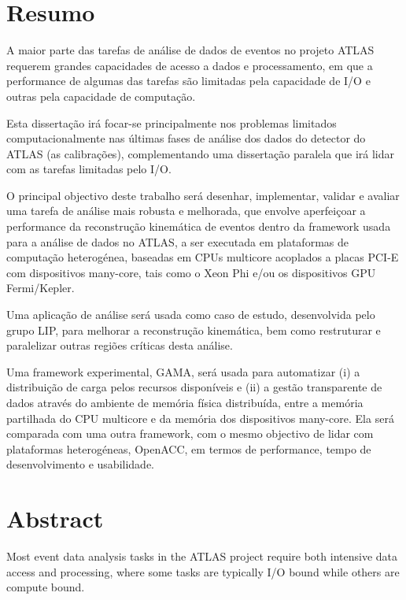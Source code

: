 
\chapter*{Resumo}

A maior parte das tarefas de análise de dados de eventos no projeto ATLAS requerem grandes capacidades de acesso a dados e processamento, em que a performance de algumas das tarefas são limitadas pela capacidade de I/O e outras pela capacidade de computação.

Esta dissertação irá focar-se principalmente nos problemas limitados computacionalmente nas últimas fases de análise dos dados do detector do ATLAS (as calibrações), complementando uma dissertação paralela que irá lidar com as tarefas limitadas pelo I/O.

O principal objectivo deste trabalho será desenhar, implementar, validar e avaliar uma tarefa de análise mais robusta e melhorada, que envolve aperfeiçoar a performance da reconstrução kinemática de eventos dentro da framework usada para a análise de dados no ATLAS, a ser executada em plataformas de computação heterogénea, baseadas em CPUs multicore acoplados a placas PCI-E com dispositivos many-core, tais como o \intel Xeon Phi e/ou os dispositivos GPU \nvidia Fermi/Kepler.

Uma aplicação de análise será usada como caso de estudo, desenvolvida pelo grupo LIP, para melhorar a reconstrução kinemática, bem como restruturar e paralelizar outras regiões críticas desta análise.

Uma framework experimental, GAMA, será usada para automatizar (i) a distribuição de carga pelos recursos disponíveis e (ii) a gestão transparente de dados através do ambiente de memória física distribuída, entre a memória partilhada do CPU multicore e da memória dos dispositivos many-core. Ela será comparada com uma outra framework, com o mesmo objectivo de lidar com plataformas heterogéneas, OpenACC, em termos de performance, tempo de desenvolvimento e usabilidade.

\newpage {}
\chapter*{Abstract}

Most event data analysis tasks in the ATLAS project require both intensive data access and processing, where some tasks are typically I/O bound while others are compute bound.

